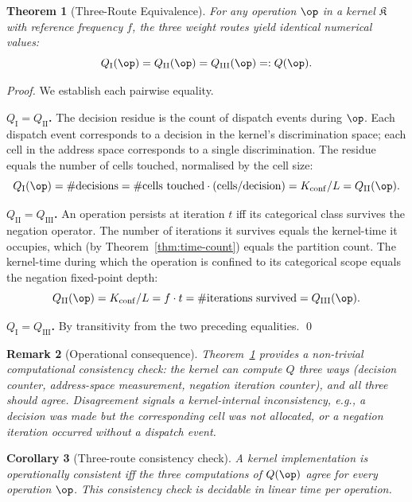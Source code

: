 \documentclass[twocolumn,11pt,a4paper]{article}
\newtheorem{theorem}{Theorem}[section]
\newtheorem{corollary}[theorem]{Corollary}
\newtheorem{remark}[theorem]{Remark}
\newcommand{\Kernel}{\mathfrak{K}}
\newcommand{\Qweight}{Q}
\begin{document}
\begin{theorem}[Three-Route Equivalence]
\label{thm:three-route}
For any operation $\op$ in a kernel $\Kernel$ with reference frequency $f$, the three weight routes yield identical numerical values:
\[
\Qweight_\mathrm{I}(\op) = \Qweight_\mathrm{II}(\op) = \Qweight_\mathrm{III}(\op) =: \Qweight(\op).
\]
\end{theorem}

\begin{proof}
We establish each pairwise equality.

\textbf{$\Qweight_\mathrm{I} = \Qweight_\mathrm{II}$.} The decision residue is the count of dispatch events during $\op$. Each dispatch event corresponds to a decision in the kernel's discrimination space; each cell in the address space corresponds to a single discrimination. The residue equals the number of cells touched, normalised by the cell size:
\[
\Qweight_\mathrm{I}(\op) = \#\text{decisions} = \#\text{cells touched} \cdot \mathrm{(cells/decision)} = K_\mathrm{conf}/L = \Qweight_\mathrm{II}(\op).
\]

\textbf{$\Qweight_\mathrm{II} = \Qweight_\mathrm{III}$.} An operation persists at iteration $t$ iff its categorical class survives the negation operator. The number of iterations it survives equals the kernel-time it occupies, which (by Theorem~\ref{thm:time-count}) equals the partition count. The kernel-time during which the operation is confined to its categorical scope equals the negation fixed-point depth:
\[
\Qweight_\mathrm{II}(\op) = K_\mathrm{conf}/L = f \cdot t = \#\text{iterations survived} = \Qweight_\mathrm{III}(\op).
\]

\textbf{$\Qweight_\mathrm{I} = \Qweight_\mathrm{III}$.} By transitivity from the two preceding equalities. \qed
\end{proof}

\begin{remark}[Operational consequence]
\label{rem:three-route-consequence}
Theorem~\ref{thm:three-route} provides a non-trivial computational consistency check: the kernel can compute $\Qweight$ three ways (decision counter, address-space measurement, negation iteration counter), and all three should agree. Disagreement signals a kernel-internal inconsistency, e.g., a decision was made but the corresponding cell was not allocated, or a negation iteration occurred without a dispatch event.
\end{remark}

\begin{corollary}[Three-route consistency check]
\label{cor:consistency}
A kernel implementation is operationally consistent iff the three computations of $\Qweight(\op)$ agree for every operation $\op$. This consistency check is decidable in linear time per operation.
\end{corollary}
\end{document}
